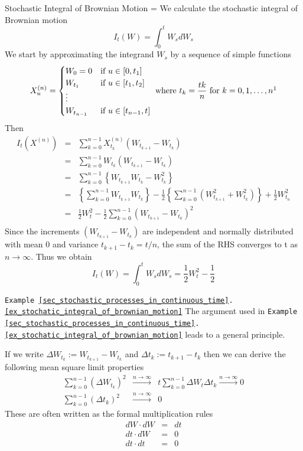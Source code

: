 \documentclass[11pt,a4paper]{article}
\begin{document}
  \begin{example}{Stochastic Integral of Brownian Motion}\label{ex_stochatic_integral_of_brownian_motion}
    \everymath={\displaystyle}
    We calculate the stochastic integral of Brownian motion
    \[ I_t(W)=\int_0^tW_sdW_s \]
    We start by approximating the integrand $W_s$ by a sequence of simple functions
    \[
      X_u^{(n)}=\begin{cases}
        W_0=0&\text{if }u\in[0,t_1]\\
        W_{t_1}&\text{if }u\in[t_1,t_2]\\
        \vdots\\
        W_{t_{n-1}}&\text{if }u\in[t_{n-1},t]
      \end{cases}\text{ where }t_k=\frac{tk}n\text{ for }k=0,1,\dots,n\footnotemark
     \]
     Then
     \[\begin{array}{rcl}
       I_t(X^{(n)})&=&\sum_{k=0}^{n-1}X_{t_k}^{(n)}(W_{t_{k+1}}-W_{t_k})\\
       &=&\sum_{k=0}^{n-1}W_{t_k}(W_{t_{k+1}}-W_{t_k})\\
       &=&\sum_{k=0}^{n-1}\left\{W_{t_{k+1}}W_{t_k}-W_{t_k}^2\right\}\\
       &=&\left\{\sum_{k=0}^{n-1}W_{t_{k+1}}W_{t_k}\right\}-\frac12\left\{\sum_{k=0}^{n-1}(W_{t_{k+1}}^2+W_{t_k}^2)\right\}+\frac12W_{t_n}^2\\
       &=&\frac12W_t^2-\frac12\sum_{k=0}^{n-1}(W_{t_{k+1}}-W_{t_k})^2\\
     \end{array}\]
     Since the increments $(W_{t_{k+1}}-W_{t_k})$ are independent and normally distributed with mean 0 and variance $t_{k+1}-t_k=t/n$, the sum of the RHS converges to t as $n\to\infty$. Thus we obtain
     \[ I_t(W)=\int_0^tW_sdW_s=\frac12W_t^2-\frac12 \]
  \end{example}

  \begin{remark}{\texttt{Example \ref{sec_stochastic_processes_in_continuous_time}.\ref{ex_stochatic_integral_of_brownian_motion}}}
    The argument used in \texttt{Example \ref{sec_stochastic_processes_in_continuous_time}.\ref{ex_stochatic_integral_of_brownian_motion}} leads to a general principle.
    \par If we write $\Delta W_{t_k}:=W_{t_{k+1}}-W_{t_k}$ and $\Delta t_k:=t_{k+1}-t_k$ then we can derive the following mean square limit properties
    \[\begin{array}{rcl}
      \sum_{k=0}^{n-1}(\Delta W_{t_k})^2&\overset{n\to\infty}{\longrightarrow}&t\sum_{k=0}^{n-1}\Delta W_t\Delta t_k\overset{n\to\infty}{\longrightarrow}0\\
      \sum_{k=0}^{n-1}(\Delta t_k)^2&\overset{n\to\infty}{\longrightarrow}&0
    \end{array}\]
    These are often written as the formal multiplication rules
    \[\begin{array}{rcl}
      dW\cdot dW&=&dt\\
      dt\cdot dW&=&0\\
      dt\cdot dt&=&0
    \end{array}\]
  \end{remark}
\end{document}
